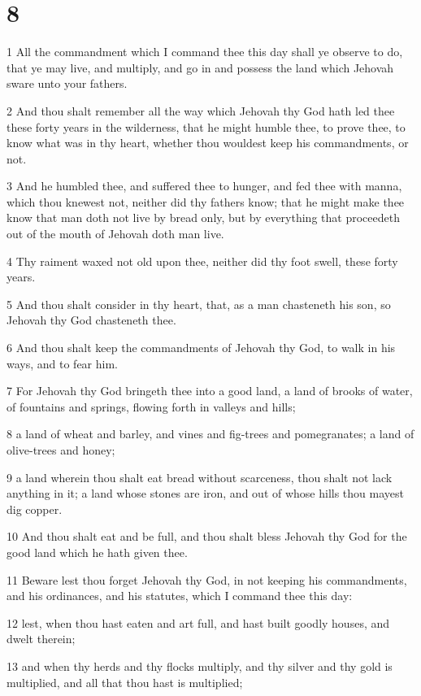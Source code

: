 \chapter{8}

\par 1 All the commandment which I command thee this day shall ye observe to do, that ye may live, and multiply, and go in and possess the land which Jehovah sware unto your fathers.
\par 2 And thou shalt remember all the way which Jehovah thy God hath led thee these forty years in the wilderness, that he might humble thee, to prove thee, to know what was in thy heart, whether thou wouldest keep his commandments, or not.
\par 3 And he humbled thee, and suffered thee to hunger, and fed thee with manna, which thou knewest not, neither did thy fathers know; that he might make thee know that man doth not live by bread only, but by everything that proceedeth out of the mouth of Jehovah doth man live.
\par 4 Thy raiment waxed not old upon thee, neither did thy foot swell, these forty years.
\par 5 And thou shalt consider in thy heart, that, as a man chasteneth his son, so Jehovah thy God chasteneth thee.
\par 6 And thou shalt keep the commandments of Jehovah thy God, to walk in his ways, and to fear him.
\par 7 For Jehovah thy God bringeth thee into a good land, a land of brooks of water, of fountains and springs, flowing forth in valleys and hills;
\par 8 a land of wheat and barley, and vines and fig-trees and pomegranates; a land of olive-trees and honey;
\par 9 a land wherein thou shalt eat bread without scarceness, thou shalt not lack anything in it; a land whose stones are iron, and out of whose hills thou mayest dig copper.
\par 10 And thou shalt eat and be full, and thou shalt bless Jehovah thy God for the good land which he hath given thee.
\par 11 Beware lest thou forget Jehovah thy God, in not keeping his commandments, and his ordinances, and his statutes, which I command thee this day:
\par 12 lest, when thou hast eaten and art full, and hast built goodly houses, and dwelt therein;
\par 13 and when thy herds and thy flocks multiply, and thy silver and thy gold is multiplied, and all that thou hast is multiplied;

